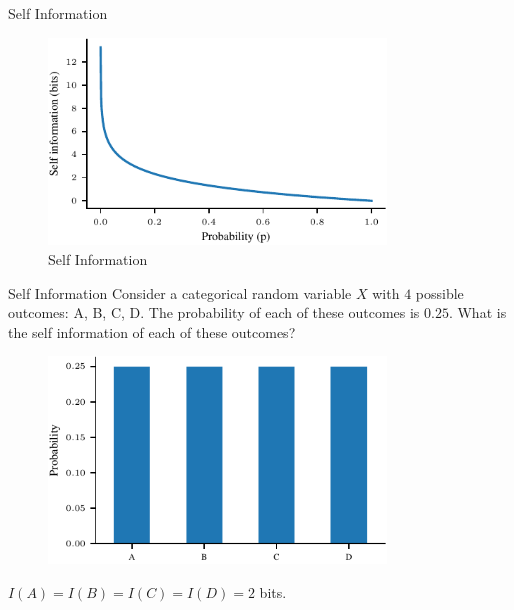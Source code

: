 \documentclass[handout]{beamer}
\begin{document}
\begin{frame}{Self Information}
    \begin{figure}
        \centering
        \includegraphics[width=0.8\textwidth]{notebooks/figures/information-theory/self-information.pdf}
        \caption{Self Information}
        \label{fig:self_info}
    \end{figure}
\end{frame}

\begin{frame}{Self Information}
    Consider a categorical random variable $X$ with $4$ possible outcomes: A, B, C, D. The probability of each of these outcomes is $0.25$. What is the self information of each of these outcomes?
    \begin{figure}
        \centering
        \includegraphics[width=0.8\textwidth]{notebooks/figures/information-theory/categorical-uniform.pdf}
        \label{fig:self_info_categorical_uniform}
    \end{figure}

    $I(A) = I(B) = I(C) = I(D) = 2$ bits.

\end{frame}
\end{document}
